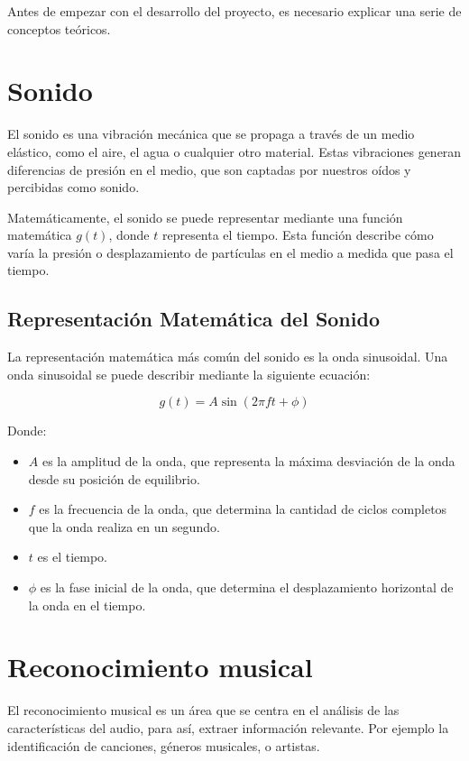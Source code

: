 
Antes de empezar con el desarrollo del proyecto, es necesario explicar una serie de conceptos teóricos.

\section{Sonido}

El sonido es una vibración mecánica que se propaga a través de un medio elástico, como el aire, el agua o cualquier otro material. Estas vibraciones generan diferencias de presión en el medio, que son captadas por nuestros oídos y percibidas como sonido.

Matemáticamente, el sonido se puede representar mediante una función matemática $g(t)$, donde $t$ representa el tiempo. Esta función describe cómo varía la presión o desplazamiento de partículas en el medio a medida que pasa el tiempo.

\subsection{Representación Matemática del Sonido}

La representación matemática más común del sonido es la onda sinusoidal. Una onda sinusoidal se puede describir mediante la siguiente ecuación:

\begin{equation}
g(t) = A \sin(2\pi ft + \phi)
\end{equation}

Donde:
\begin{itemize}
\item $A$ es la amplitud de la onda, que representa la máxima desviación de la onda desde su posición de equilibrio.
\item $f$ es la frecuencia de la onda, que determina la cantidad de ciclos completos que la onda realiza en un segundo.
\item $t$ es el tiempo.
\item $\phi$ es la fase inicial de la onda, que determina el desplazamiento horizontal de la onda en el tiempo.
\end{itemize}

\section{Reconocimiento musical}

El reconocimiento musical es un área que se centra en el análisis de las características del audio, para así, extraer información relevante. Por ejemplo la identificación de canciones, géneros musicales, o artistas.

